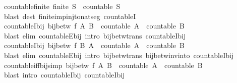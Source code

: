 \begin{isabellebody}
\endisatagproof
{\isafoldproof}%
%
\isadelimproof
\isanewline
%
\endisadelimproof
\isanewline
{}\isamarkupfalse%
\ countable{\isacharunderscore}finite{\isacharcolon}\ {\isachardoublequoteopen}finite\ S\ {\isasymLongrightarrow}\ countable\ S{\isachardoublequoteclose}\isanewline
%
\isadelimproof
\ \ %
\endisadelimproof
%
\isatagproof
{}\isamarkupfalse%
\ {\isacharparenleft}blast\ dest{\isacharcolon}\ finite{\isacharunderscore}imp{\isacharunderscore}inj{\isacharunderscore}to{\isacharunderscore}nat{\isacharunderscore}seg\ countableI{\isacharparenright}%
\endisatagproof
{\isafoldproof}%
%
\isadelimproof
\isanewline
%
\endisadelimproof
\isanewline
{}\isamarkupfalse%
\ countableI{\isacharunderscore}bij{}{\isacharcolon}\ {\isachardoublequoteopen}bij{\isacharunderscore}betw\ f\ A\ B\ {\isasymLongrightarrow}\ countable\ A\ {\isasymLongrightarrow}\ countable\ B{\isachardoublequoteclose}\isanewline
%
\isadelimproof
\ \ %
\endisadelimproof
%
\isatagproof
{}\isamarkupfalse%
\ {\isacharparenleft}blast\ elim{\isacharcolon}\ countableE{\isacharunderscore}bij\ intro{\isacharcolon}\ bij{\isacharunderscore}betw{\isacharunderscore}trans\ countableI{\isacharunderscore}bij{\isacharparenright}%
\endisatagproof
{\isafoldproof}%
%
\isadelimproof
\isanewline
%
\endisadelimproof
\isanewline
{}\isamarkupfalse%
\ countableI{\isacharunderscore}bij{}{\isacharcolon}\ {\isachardoublequoteopen}bij{\isacharunderscore}betw\ f\ B\ A\ {\isasymLongrightarrow}\ countable\ A\ {\isasymLongrightarrow}\ countable\ B{\isachardoublequoteclose}\isanewline
%
\isadelimproof
\ \ %
\endisadelimproof
%
\isatagproof
{}\isamarkupfalse%
\ {\isacharparenleft}blast\ elim{\isacharcolon}\ countableE{\isacharunderscore}bij\ intro{\isacharcolon}\ bij{\isacharunderscore}betw{\isacharunderscore}trans\ bij{\isacharunderscore}betw{\isacharunderscore}inv{\isacharunderscore}into\ countableI{\isacharunderscore}bij{\isacharparenright}%
\endisatagproof
{\isafoldproof}%
%
\isadelimproof
\isanewline
%
\endisadelimproof
\isanewline
{}\isamarkupfalse%
\ countable{\isacharunderscore}iff{\isacharunderscore}bij{\isacharbrackleft}simp{\isacharbrackright}{\isacharcolon}\ {\isachardoublequoteopen}bij{\isacharunderscore}betw\ f\ A\ B\ {\isasymLongrightarrow}\ countable\ A\ {\isasymlongleftrightarrow}\ countable\ B{\isachardoublequoteclose}\isanewline
%
\isadelimproof
\ \ %
\endisadelimproof
%
\isatagproof
{}\isamarkupfalse%
\ {\isacharparenleft}blast\ intro{\isacharcolon}\ countableI{\isacharunderscore}bij{}\ countableI{\isacharunderscore}bij{}{\isacharparenright}%

\end{isabellebody}
